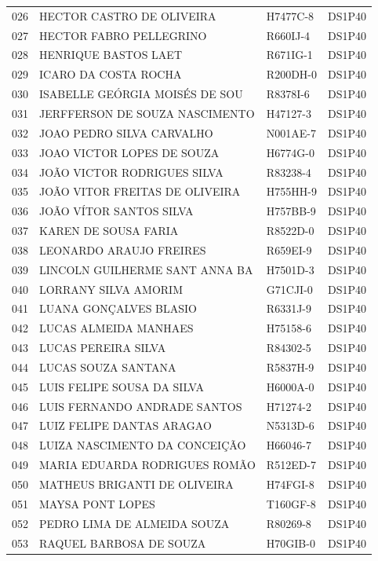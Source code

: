 \documentclass[
]{book}
\begin{document}
\begin{longtable}[]{@{}llll@{}}
026 & HECTOR CASTRO DE OLIVEIRA & H7477C-8 & DS1P40 \\
027 & HECTOR FABRO PELLEGRINO & R660IJ-4 & DS1P40 \\
028 & HENRIQUE BASTOS LAET & R671IG-1 & DS1P40 \\
029 & ICARO DA COSTA ROCHA & R200DH-0 & DS1P40 \\
030 & ISABELLE GEÓRGIA MOISÉS DE SOU & R8378I-6 & DS1P40 \\
031 & JERFFERSON DE SOUZA NASCIMENTO & H47127-3 & DS1P40 \\
032 & JOAO PEDRO SILVA CARVALHO & N001AE-7 & DS1P40 \\
033 & JOAO VICTOR LOPES DE SOUZA & H6774G-0 & DS1P40 \\
034 & JOÃO VICTOR RODRIGUES SILVA & R83238-4 & DS1P40 \\
035 & JOÃO VITOR FREITAS DE OLIVEIRA & H755HH-9 & DS1P40 \\
036 & JOÃO VÍTOR SANTOS SILVA & H757BB-9 & DS1P40 \\
037 & KAREN DE SOUSA FARIA & R8522D-0 & DS1P40 \\
038 & LEONARDO ARAUJO FREIRES & R659EI-9 & DS1P40 \\
039 & LINCOLN GUILHERME SANT ANNA BA & H7501D-3 & DS1P40 \\
040 & LORRANY SILVA AMORIM & G71CJI-0 & DS1P40 \\
041 & LUANA GONÇALVES BLASIO & R6331J-9 & DS1P40 \\
042 & LUCAS ALMEIDA MANHAES & H75158-6 & DS1P40 \\
043 & LUCAS PEREIRA SILVA & R84302-5 & DS1P40 \\
044 & LUCAS SOUZA SANTANA & R5837H-9 & DS1P40 \\
045 & LUIS FELIPE SOUSA DA SILVA & H6000A-0 & DS1P40 \\
046 & LUIS FERNANDO ANDRADE SANTOS & H71274-2 & DS1P40 \\
047 & LUIZ FELIPE DANTAS ARAGAO & N5313D-6 & DS1P40 \\
048 & LUIZA NASCIMENTO DA CONCEIÇÃO & H66046-7 & DS1P40 \\
049 & MARIA EDUARDA RODRIGUES ROMÃO & R512ED-7 & DS1P40 \\
050 & MATHEUS BRIGANTI DE OLIVEIRA & H74FGI-8 & DS1P40 \\
051 & MAYSA PONT LOPES & T160GF-8 & DS1P40 \\
052 & PEDRO LIMA DE ALMEIDA SOUZA & R80269-8 & DS1P40 \\
053 & RAQUEL BARBOSA DE SOUZA & H70GIB-0 & DS1P40 \\

\end{longtable}
\end{document}
